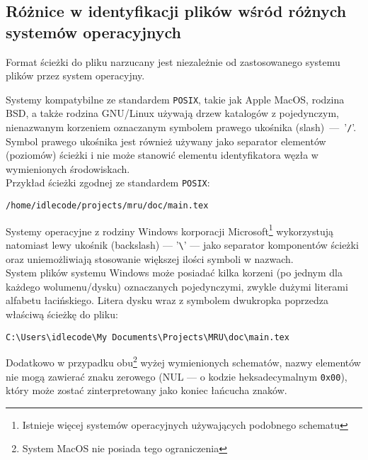 \subsection{Różnice w identyfikacji plików wśród różnych systemów operacyjnych}
\par
Format ścieżki do pliku narzucany jest niezależnie od zastosowanego systemu plików przez system operacyjny.

\par
Systemy kompatybilne ze standardem \texttt{POSIX}, takie jak Apple MacOS, rodzina BSD, a także rodzina GNU/Linux używają drzew katalogów z pojedynczym, nienazwanym korzeniem oznaczanym symbolem prawego ukośnika (slash)~---~'\texttt{/}'.\\
Symbol prawego ukośnika jest również używany jako separator elementów (poziomów) ścieżki i nie może stanowić elementu identyfikatora węzła w wymienionych środowiskach.\\
Przykład ścieżki zgodnej ze standardem \texttt{POSIX}:
\begin{center}
\texttt{/home/idlecode/projects/mru/doc/main.tex}
\end{center}

\par
Systemy operacyjne z rodziny Windows korporacji Microsoft\footnote{Istnieje  więcej systemów operacyjnych używających podobnego schematu} wykorzystują natomiast lewy ukośnik (backslash) --- '\texttt{\textbackslash}' --- jako separator komponentów ścieżki oraz uniemożliwiają stosowanie większej ilości symboli w nazwach.\\
System plików systemu Windows może posiadać kilka korzeni (po jednym dla każdego wolumenu/dysku) oznaczanych pojedynczymi, zwykle dużymi literami alfabetu łacińskiego. Litera dysku wraz z symbolem dwukropka poprzedza właściwą ścieżkę do pliku:\\
\begin{center}
\texttt{C:\textbackslash Users\textbackslash idlecode\textbackslash My Documents\textbackslash Projects\textbackslash MRU\textbackslash doc\textbackslash main.tex}
\end{center}

\par
Dodatkowo w przypadku obu\footnote{System MacOS nie posiada tego ograniczenia} wyżej wymienionych schematów, nazwy elementów nie mogą zawierać znaku zerowego (NUL --- o kodzie heksadecymalnym \texttt{0x00}), który może zostać zinterpretowany jako koniec łańcucha znaków.

